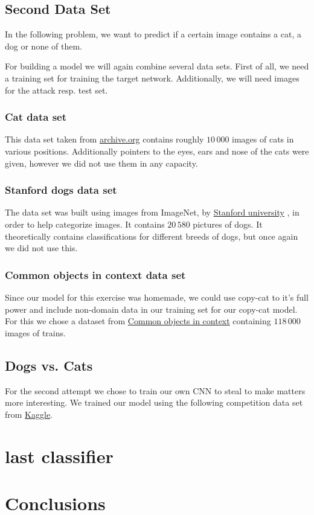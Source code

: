 \documentclass[a4paper,11pt]{article}
\begin{document}
    \subsection{Second Data Set}
        In the following problem, we want to predict if a certain image contains a cat, a dog or none of them. 
        
        For building a model we will again combine several data sets. First of all, we need a training set for training the target network. Additionally, we will need images for the attack resp. test set. 
        
        \subsubsection{Cat data set}
            This data set taken from \hyperlink{https://archive.org/details/CAT_DATASET}{archive.org} contains roughly $10\,000$ images of cats in various positions. Additionally pointers to the eyes, ears and nose of the cats were given, however we did not use them in any capacity. 
            
        \subsubsection{Stanford dogs data set }
            The data set was built using images from ImageNet, by \hyperlink{http://vision.stanford.edu/aditya86/ImageNetDogs/}{Stanford university} , in order to help categorize images. It contains $20\,580$ pictures of dogs. It theoretically contains classifications for different breeds of dogs, but once again we did not use this.
            
        \subsubsection{Common objects in context data set}
            Since our model for this exercise was homemade, we could use copy-cat to it's full power and include non-domain data in our training set for our copy-cat model. For this we chose a dataset from \hyperlink{https://cocodataset.org/\#download}{Common objects in context} containing $118\,000$ images of trains.
            
        
     \subsection{Dogs vs. Cats}
            For the second attempt we chose to train our own CNN to steal to make matters more interesting. We trained our model using the following competition data set from \hyperlink{https://www.kaggle.com/c/dogs-vs-cats/data}{Kaggle}. 
\section{last classifier}



\section{Conclusions}



\end{document}
